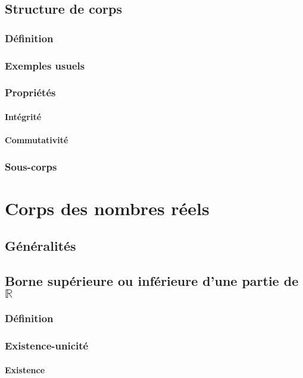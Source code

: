 \documentclass[12pt,a4paper,french]{book}
\begin{document}
\begin{spacing}{1.0}
	\section{Structure de corps}
		\subsection{Définition}
		\subsection{Exemples usuels}
		\subsection{Propriétés}
			\subsubsection{Intégrité}
			\subsubsection{Commutativité}
		\subsection{Sous-corps}
	\end{spacing}
	
	
	
\chapter{Corps des nombres réels}
	\section{Généralités}
	\section{Borne supérieure ou inférieure d'une partie de $\mathbb{R}$}
		\subsection{Définition}
		\subsection{Existence-unicité}
			\subsubsection{Existence}
\end{document}
